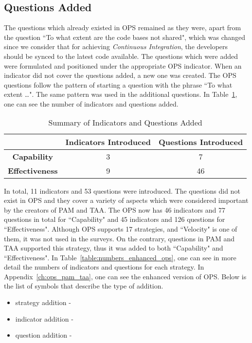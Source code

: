 \subsection{Questions Added}
The questions which already existed in \ac{OPS} remained as they were, apart from the question ``To what extent are the code bases not shared", which was changed since we consider that for achieving \textit{Continuous Integration}, the developers should be synced to the latest code available. The questions which were added were formulated and positioned under the appropriate \ac{OPS} indicator. When an indicator did not cover the questions added, a new one was created. The \ac{OPS} questions follow the pattern of starting a question with the phrase ``To what extent \dots ". The same pattern was used in the additional questions. In Table~\ref{table:summary_questions_added}, one can see the number of indicators and questions added. 

\begin{table} [H]
	\caption{Summary of Indicators and Questions Added}
	\label{table:summary_questions_added}
	\begin{tabular}{| c | c | c |} \hline
		 & \textbf{Indicators Introduced} & \textbf{Questions Introduced} \\ \hline
		 \textbf{Capability} & 3 & 7 \\ \hline
		 \textbf{Effectiveness} & 9 & 46 \\ \hline
	\end{tabular}
\end{table}

In total, 11 indicators and 53 questions were introduced. The questions did not exist in \ac{OPS} and they cover a variety of aspects which were considered important by the creators of \ac{PAM} and \ac{TAA}. The \ac{OPS} now has 46 indicators and 77 questions in total for ``Capability" and 45 indicators and 126 questions for ``Effectiveness". Although \ac{OPS} supports 17 strategies, and ``Velocity" is one of them, it was not used in the surveys. On the contrary, questions in \ac{PAM} and \ac{TAA} supported this strategy, thus it was added to both ``Capability" and ``Effectiveness". In Table~\ref{table:numbers_enhanced_ops}, one can see in more detail the numbers of indicators and questions for each strategy. In Appendix~\ref{ch:ops_pam_taa}, one can see the enhanced version of \ac{OPS}. Below is the list of symbols that describe the type of addition.

\begin{itemize}
	\item strategy addition - \TwelweStar
	\item indicator addition - \FiveStarOutline
	\item question addition - \FiveStar
\end{itemize}

